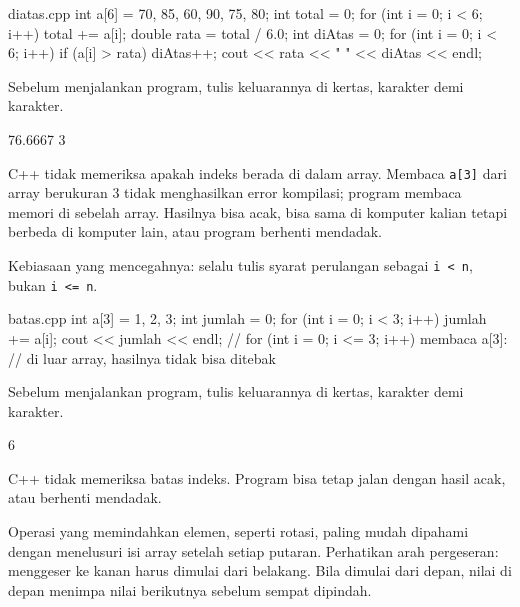 \documentclass[a4paper]{article}
\begin{document}
\begin{MKode}{diatas.cpp}
int a[6] = {70, 85, 60, 90, 75, 80};
int total = 0;
for (int i = 0; i < 6; i++) total += a[i];
double rata = total / 6.0;
int diAtas = 0;
for (int i = 0; i < 6; i++) {
    if (a[i] > rata) diAtas++;
}
cout << rata << " " << diAtas << endl;
\end{MKode}
\begin{Tebak}[]
Sebelum menjalankan program, tulis keluarannya di kertas, karakter demi karakter.
\end{Tebak}
\begin{Jawaban}[]
\begin{MKeluaran}[]
76.6667 3
\end{MKeluaran}

\end{Jawaban}
C++ tidak memeriksa apakah indeks berada di dalam array. Membaca \texttt{a[3]} dari array berukuran 3 tidak menghasilkan error kompilasi; program membaca memori di sebelah array. Hasilnya bisa acak, bisa sama di komputer kalian tetapi berbeda di komputer lain, atau program berhenti mendadak.

Kebiasaan yang mencegahnya: selalu tulis syarat perulangan sebagai \texttt{i < n}, bukan \texttt{i <= n}.

\begin{MKode}{batas.cpp}
int a[3] = {1, 2, 3};
int jumlah = 0;
for (int i = 0; i < 3; i++) {
    jumlah += a[i];
}
cout << jumlah << endl;
// for (int i = 0; i <= 3; i++) membaca a[3]:
// di luar array, hasilnya tidak bisa ditebak
\end{MKode}
\begin{Tebak}[]
Sebelum menjalankan program, tulis keluarannya di kertas, karakter demi karakter.
\end{Tebak}
\begin{Jawaban}[]
\begin{MKeluaran}[]
6
\end{MKeluaran}
C++ tidak memeriksa batas indeks. Program bisa tetap jalan dengan hasil acak, atau berhenti mendadak.
\end{Jawaban}
Operasi yang memindahkan elemen, seperti rotasi, paling mudah dipahami dengan menelusuri isi array setelah setiap putaran. Perhatikan arah pergeseran: menggeser ke kanan harus dimulai dari belakang. Bila dimulai dari depan, nilai di depan menimpa nilai berikutnya sebelum sempat dipindah.
\end{document}
